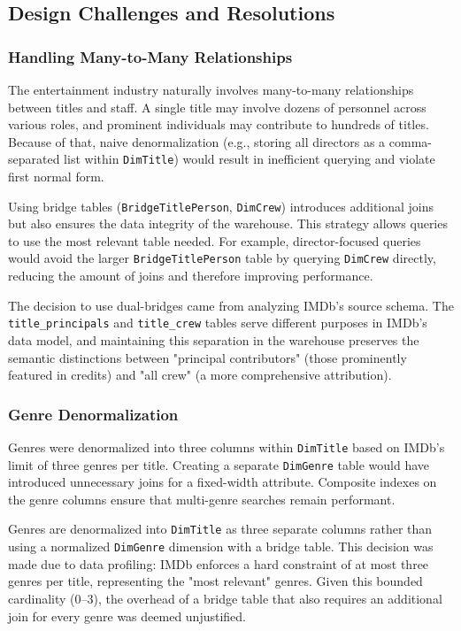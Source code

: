 \subsection{Design Challenges and Resolutions}

\subsubsection{Handling Many-to-Many Relationships}

The entertainment industry naturally involves many-to-many relationships between titles and staff. A single title may involve dozens of personnel across various roles, and prominent individuals may contribute to hundreds of titles. Because of that, naive denormalization (e.g., storing all directors as a comma-separated list within \texttt{DimTitle}) would result in inefficient querying and violate first normal form.

Using bridge tables (\texttt{BridgeTitlePerson}, \texttt{DimCrew}) introduces additional joins but also ensures the data integrity of the warehouse. This strategy allows queries to use the most relevant table needed. For example, director-focused queries would avoid the larger \texttt{BridgeTitlePerson} table by querying \texttt{DimCrew} directly, reducing the amount of joins and therefore improving performance.

The decision to use dual-bridges came from analyzing IMDb's source schema. The \texttt{title\_principals} and \texttt{title\_crew} tables serve different purposes in IMDb's data model, and maintaining this separation in the warehouse preserves the semantic distinctions between "principal contributors" (those prominently featured in credits) and "all crew" (a more comprehensive attribution). 

\subsubsection{Genre Denormalization}

Genres were denormalized into three columns within \texttt{DimTitle} based on IMDb’s limit of three genres per title. Creating a separate \texttt{DimGenre} table would have introduced unnecessary joins for a fixed-width attribute. Composite indexes on the genre columns ensure that multi-genre searches remain performant.

Genres are denormalized into \texttt{DimTitle} as three separate columns rather than using a normalized \texttt{DimGenre} dimension with a bridge table. This decision was made due to data profiling: IMDb enforces a hard constraint of at most three genres per title, representing the "most relevant" genres. Given this bounded cardinality (0–3), the overhead of a bridge table that also requires an additional join for every genre was deemed unjustified.

